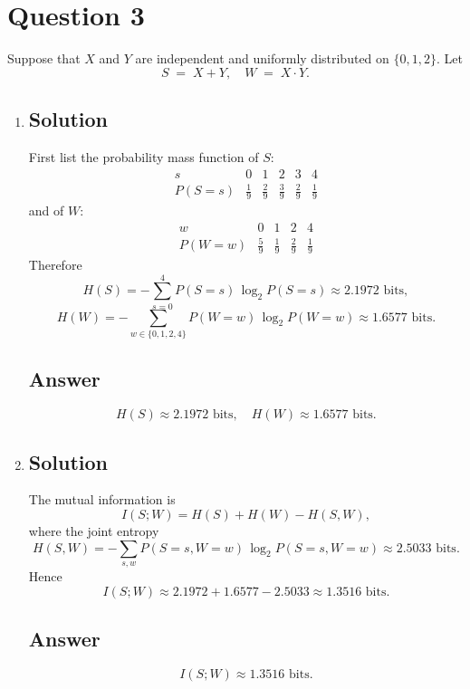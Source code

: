 \documentclass[12pt]{article}
\begin{document}
	
	\section*{Question 3}
	
	\noindent 
	Suppose that $X$ and $Y$ are independent and uniformly distributed on $\{0,1,2\}$.  Let
	\[
	S \;=\; X + Y,\quad
	W \;=\; X\cdot Y.
	\]
	
	\begin{enumerate}[start=1,label={\bfseries Part \arabic*:},leftmargin=0in]
		\bigskip\item 
		
		\subsection*{Solution}
		First list the probability mass function of $S$:
		\[
		\begin{array}{c|ccccc}
			s & 0 & 1 & 2 & 3 & 4\\\hline
			P(S=s) & \tfrac{1}{9} & \tfrac{2}{9} & \tfrac{3}{9} & \tfrac{2}{9} & \tfrac{1}{9}
		\end{array}
		\]
		and of $W$:
		\[
		\begin{array}{c|cccc}
			w & 0 & 1 & 2 & 4\\\hline
			P(W=w) & \tfrac{5}{9} & \tfrac{1}{9} & \tfrac{2}{9} & \tfrac{1}{9}
		\end{array}
		\]
		Therefore
		\[
		H(S)
		=-\sum_{s=0}^4 P(S=s)\,\log_2P(S=s)
		\approx2.1972\text{ bits},
		\]
		\[
		H(W)
		=-\sum_{w\in\{0,1,2,4\}}P(W=w)\,\log_2P(W=w)
		\approx1.6577\text{ bits}.
		\]
		
		\subsection*{Answer}
		\[
		\boxed{
			H(S)\approx2.1972\text{ bits},\quad
			H(W)\approx1.6577\text{ bits}.
		}
		\]
		
		\bigskip\item 
		
		\subsection*{Solution}
		The mutual information is
		\[
		I(S;W)
		=H(S)+H(W)-H(S,W),
		\]
		where the joint entropy
		\[
		H(S,W)
		=-\sum_{s,w}P(S=s,W=w)\,\log_2P(S=s,W=w)
		\approx2.5033\text{ bits}.
		\]
		Hence
		\[
		I(S;W)
		\approx2.1972+1.6577-2.5033
		\approx1.3516\text{ bits}.
		\]
		
		\subsection*{Answer}
		\[
		\boxed{I(S;W)\approx1.3516\text{ bits}.}
		\]
	\end{enumerate}
	
\end{document}
